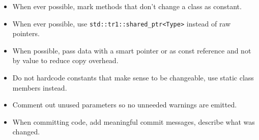 \begin{itemize}
\item When ever possible, mark methods that don't change a class as constant.
\item When ever possible, use \lstinline{std::tr1::shared_ptr<Type>} instead of raw pointers.
\item When possible, pass data with a smart pointer or as const reference and not by value to reduce copy overhead.
\item Do not hardcode constants that make sense to be changeable, use static class members instead.
\item Comment out unused parameters so no unneeded warnings are emitted.
\item When committing code, add meaningful commit messages, describe what was changed.
\end{itemize}


